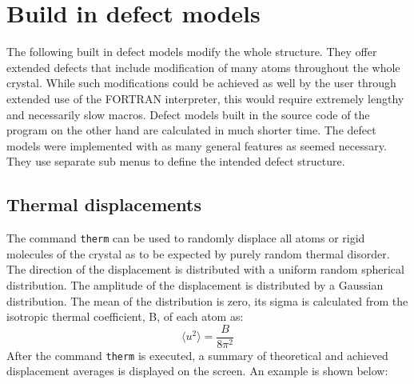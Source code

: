 
\chapter{Build in defect models \label{mod}}

The following built in defect models modify the whole structure.
They offer extended defects that include modification of many
atoms throughout the whole crystal.  While such modifications
could be achieved as well by the user through extended use of the
FORTRAN interpreter, this would require extremely lengthy and
necessarily slow macros.  Defect models built in the source code
of the program on the other hand are calculated in much shorter
time.  The defect models were implemented with as many general
features as seemed necessary.  They use separate sub menus to
define the intended defect structure.


\section{Thermal displacements \label{mod-therm}}

The command {\tt therm} can be used to randomly displace all atoms
or rigid molecules of the crystal as to be expected by purely random
thermal disorder.  The direction of the displacement is distributed
with a uniform random spherical distribution.  The amplitude of the
displacement is distributed by a Gaussian distribution.  The mean of
the distribution is zero, its sigma is calculated from the isotropic
thermal coefficient, B, of each atom as:
%
\begin{equation}
    \langle u^{2} \rangle = \frac{B}{8 \pi^{2}}
    \label{therm-eq1}
\end{equation}
%
After the command {\tt therm} is executed, a summary of theoretical
and achieved displacement averages is displayed on the screen. An
example is shown below:
%

